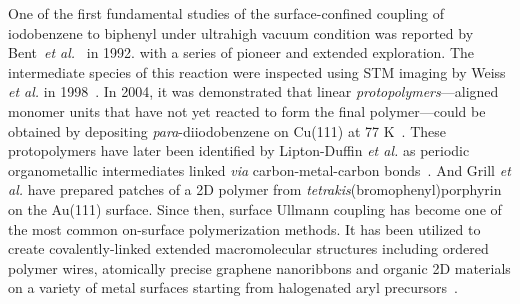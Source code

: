 \documentclass[%
 reprint,
 amsmath,amssymb,
 aps,
prb,
floatfix,
]{revtex4-2}
\begin{document}
{One of the first fundamental studies of the surface-confined coupling of iodobenzene to biphenyl under ultrahigh vacuum condition was reported by Bent~\textit{et al.}~\cite{sur_sci01} in 1992. with a series of pioneer and extended exploration\cite{ullmann_127, ullmann_128, ullmann_129, ullmann_87}.
%
The intermediate species of this reaction were inspected using STM imaging by Weiss \textit{et al.} in 1998~\cite{langm01}. 
In 2004, it was demonstrated that linear \emph{protopolymers}---aligned monomer units that have not yet reacted to form the final polymer---could be obtained by depositing \textit{para}-diiodobenzene on Cu(111) at 77 K~\cite{jacs01}. 
%
These protopolymers have later been identified by Lipton-Duffin \textit{et al.} as periodic organometallic intermediates linked \textit{via} carbon-metal-carbon bonds~\cite{ullmann_88}.
And Grill \textit{et al.} have prepared patches of a 2D polymer from \textit{tetrakis}(bromophenyl)porphyrin on the Au(111) surface.
%
Since then, surface Ullmann coupling has become one of the most common on-surface polymerization methods. It has been utilized to create covalently-linked extended macromolecular structures including ordered polymer wires, atomically precise graphene nanoribbons and organic 2D materials on a variety of metal surfaces starting from halogenated aryl precursors~\cite{ullmann_33,ullmann_34, ullmann_42, ullmann_43, ullmann_45, ullmann_46, ullmann_47, ullmann_48}. 

}




\end{document}
